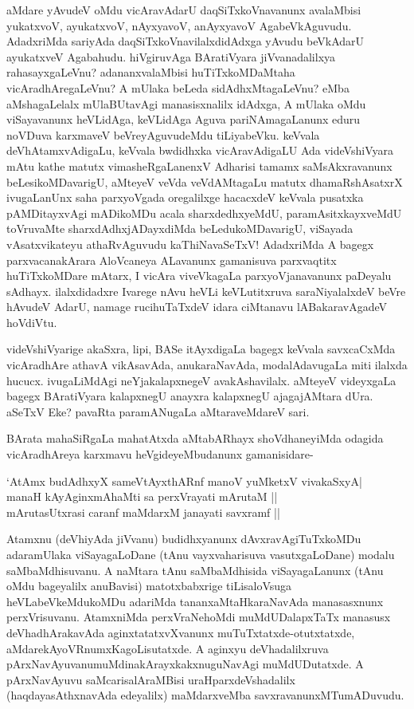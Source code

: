 aMdare yAvudeV oMdu vicAravAdarU daqSiTxkoVnavanunx avalaMbisi yukatxvoV, ayukatxvoV, nAyxyavoV, anAyxyavoV AgabeVkAguvudu. AdadxriMda sariyAda daqSiTxkoVnavilalxdidAdxga yAvudu beVkAdarU ayukatxveV Agabahudu. hiVgiruvAga BAratiVyara jiVvanadalilxya rahasayxgaLeVnu? ada\-nanxva\-laMbisi huTiTxkoMDaMtaha vicAradhAregaLeVnu? A mUlaka beLeda sidAdhxMtagaLeVnu? eMba aMsha\-gaLelalx mUlaBUtavAgi manasisxnalilx idAdxga, A mUlaka oMdu viSayavanunx heVLidAga, keVLidAga Aguva pariNAmagaLanunx eduru noVDuva karxmaveV beVreyAguvudeMdu tiLiyabeVku. keVvala deVhAtamx\-vAdi\-gaLu, keVvala bwdidhxka vicAravAdigaLU Ada videVshiVyara mAtu kathe matutx vimasheRgaLanenxV Adha\-risi tamamx saMsAkxravanunx beLesikoMDavarigU, aMteyeV veVda veVdAMtagaLu matutx dhamaRshAsatxrX ivu\-gaLanUnx saha parxyoVgada oregalilxge hacacxdeV keVvala pusatxka pAMDitayxvAgi mADikoMDu acala sharxdedhx\-yeMdU, paramAsitxkayxveMdU toVruvaMte sharxdAdhxjADayxdiMda beLedukoMDavarigU, viSayada vAsatxvi\-kateyu athaR\-vAguvudu kaThiNavaSeTxV! AdadxriMda A bagegx parxvacanakArara AloVcaneya ALavanunx gamani\-suva parx\-vaqtitx huTiTxkoMDare mAtarx, I vicAra viveVkagaLa parxyoVjanavanunx paDeyalu sAdhayx. ilalxdidadxre Ivarege nAvu heVLi keVLutitxruva saraNiyalalxdeV beVre hAvudeV AdarU, namage rucihuTaTxdeV idara ciMtanavu lABakaravAgadeV hoVdiVtu.

videVshiVyarige akaSxra, lipi, BASe itAyxdigaLa bagegx keVvala savxcaCxMda vicAradhAre athavA vikAsa\-vAda, anukaraNavAda, modalAdavugaLa miti ilalxda hucucx. ivugaLiMdAgi neYjakalapxnegeV avakAsha\-vilalx. aMteyeV\- videyxgaLa bagegx BAratiVyara kalapxnegU anayxra kalapxnegU ajagajAMtara dUra. aSeTxV Eke? pavaRta paramANugaLa aMtaraveMdareV sari.

BArata mahaSiRgaLa mahatAtxda aMtabARhayx shoVdhaneyiMda odagida vicAradhAreya karxmavu \-heVgide\-yeMbu\-danunx gamanisidare-

\begin{shloka}
`AtAmx budAdhxyX sameVtAyxthARnf manoV yuMketxV vivakaSxyA|\\
manaH kAyAginxmAhaMti sa perxVrayati mArutaM ||\\
mArutasUtxrasi caranf maMdarxM janayati savxramf ||
\end{shloka}

Atamxnu (deVhiyAda jiVvanu) budidhxyanunx dAvxravAgiTuTxkoMDu adara\break \hbox{mUlaka} viSaya\-gaLoDane (tAnu vayxvaharisuva vasutxgaLoDane) modalu saMbaMdhi\-suvanu. A naMtara tAnu saMbaMdhisida viSaya\-gaLanunx (tAnu oMdu bageyalilx anuBavisi) matotxbabxrige tiLisaloVsuga heVLa\-beVkeMdu\-koMDu ada\-riMda tananx\break aMtaHkaraNavAda manasasxnunx perxVrisuvanu. AtamxniMda perxVraNehoMdi muMdUDa\-lapxTaTx manasusx deVhadhArakavAda aginxtatatxvXvanunx muTuTxtatxde-otutxtatxde, aMdare\break kAyoVR\-numxKagoLisutatxde. A aginxyu deVhadalilxruva pArxNavAyuvanu\break muMdina\-kArayxkakxnuguNavAgi muMdUDutatxde. A pArxNavAyuvu saMcarisalA\-raMBisi uraHparxdeVshadalilx (haqdayasAthxnavAda edeyalilx) maMdarxveMba savxra\break\-vanunxMTu\-mADuvudu.

